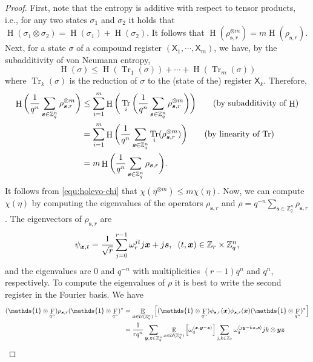 \documentclass[11pt]{article}
\theoremstyle{plain}
\theoremstyle{definition}
\DeclareMathOperator{\tr}{Tr} %
\DeclareMathOperator{\entpy}{H}
\DeclareMathOperator{\qft}{F}
\DeclareMathOperator{\E}{\mathbb{E}}
\let\ket\relax
\DeclarePairedDelimiter{\ket}{\lvert}{\rangle}
\let\bra\relax
\DeclarePairedDelimiter{\bra}{\langle}{\rvert}
\DeclarePairedDelimiter{\lrang}{\langle}{\rangle}
\def\Z{\mathbb{Z}}
\def\U{\mathcal{U}}
\begin{document}
\begin{proof}
    First, note that the entropy is additive with respect to tensor products, i.e., for any two states $\sigma_1$ and $\sigma_2$ it holds that $\entpy(\sigma_1 \otimes \sigma_2) = \entpy(\sigma_1) + \entpy(\sigma_2)$. It follows that $\entpy(\rho_{\bm{s}, r}^{\otimes m}) = m\entpy(\rho_{\bm{s}, r})$. Next, for a state $\sigma$ of a compound register $(\mathsf{X}_1, \cdots, \mathsf{X}_m)$, we have, by the subadditivity of von Neumann entropy,
    \[ \entpy(\sigma) \le \entpy(\tr_1(\sigma)) + \cdots + \entpy(\tr_m(\sigma))\]
    where $\tr_k(\sigma)$ is the reduction of $\sigma$ to the (state of the) register $\mathsf{X}_k$. Therefore,
    \begin{align*}
        \entpy\bigg( \frac{1}{q^n} \sum_{\bm{s} \in \Z_q^n} \rho_{\bm{s}, r}^{\otimes m} \bigg)
        & \le \sum_{i = 1}^m \entpy\bigg(\tr_i\bigg( \frac{1}{q^n} \sum_{\bm{s} \in \Z_q^n} \rho_{\bm{s}, r}^{\otimes m} \bigg)\bigg) \tag{by subadditivity of $\entpy$} \\
        & = \sum_{i = 1}^m \entpy\bigg(\frac{1}{q^n} \sum_{\bm{s} \in \Z_q^n} \tr_i(\rho_{\bm{s}, r}^{\otimes m}) \bigg) \tag{by linearity of $\tr$} \\
        & = m\entpy\bigg( \frac{1}{q^n} \sum_{\bm{s} \in \Z_q^n} \rho_{\bm{s}, r} \bigg).
    \end{align*}
    It follows from \eqref{equ:holevo-chi}  that $\chi(\eta^{\otimes m}) \le m\chi(\eta)$. Now, we can compute $\chi(\eta)$ by computing the eigenvalues of the operators $\rho_{\bm{s}, r}$ and $\rho = q^{-n}\sum_{\bm{s} \in \Z_q^n} \rho_{\bm{s}, r}$. The eigenvectors of $\rho_{\bm{s}, r}$ are
    \[ \ket{\psi_{\bm{x}, t}} = \frac{1}{\sqrt{r}} \sum_{j = 0}^{r - 1} \omega_r^{jt} \ket{j}\ket{\bm{x} + j\bm{s}}, \hspace*{2mm} (t, \bm{x}) \in \Z_r \times \Z_q^n, \]
    and the eigenvalues are $0$ and $q^{-n}$ with multiplicities $(r - 1)q^n$ and $q^n$, respectively. To compute the eigenvalues of $\rho$ it is best to write the second register in the Fourier basis. We have
    \begin{align*}
        (\mathds{1} \otimes \qft_{q^n}) \rho_{\bm{s}, r} (\mathds{1} \otimes \qft_{q^n})^*
        & = \E_{\bm{x} \in \U(\Z_q^n)} \Big[ (\mathds{1} \otimes \qft_{q^n}) \ket{\phi_{\bm{s}, r}(\bm{x})} \bra{\phi_{\bm{s}, r}(\bm{x})} (\mathds{1} \otimes \qft_{q^n})^* \Big] \\
        & = \frac{1}{rq^n} \sum_{\bm{y}, \bm{z} \in \Z_q^n} \E_{\bm{x} \in \U(\Z_q^n)} \Big[ \omega_q^{\lrang{\bm{x}, \bm{y} - \bm{z}}} \Big] \sum_{j, k \in \Z_r} \omega_q^{\lrang{j\bm{y} - k\bm{z}, \bm{s}}} \ket{j}\bra{k} \otimes \ket{\bm{y}}\bra{\bm{z}} \\

\end{align*}
\end{proof}
\end{document}
